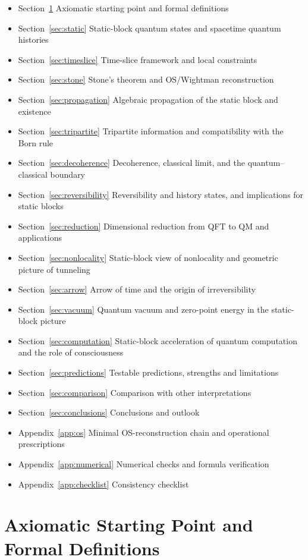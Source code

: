\documentclass[11pt]{article}
\theoremstyle{definition}
\theoremstyle{remark}
\begin{document}
\begin{itemize}
\item Section~\ref{sec:axioms} Axiomatic starting point and formal definitions
\item Section~\ref{sec:static} Static-block quantum states and spacetime quantum histories
\item Section~\ref{sec:timeslice} Time-slice framework and local constraints
\item Section~\ref{sec:stone} Stone's theorem and OS/Wightman reconstruction
\item Section~\ref{sec:propagation} Algebraic propagation of the static block and existence
\item Section~\ref{sec:tripartite} Tripartite information and compatibility with the Born rule
\item Section~\ref{sec:decoherence} Decoherence, classical limit, and the quantum--classical boundary
\item Section~\ref{sec:reversibility} Reversibility and history states, and implications for static blocks
\item Section~\ref{sec:reduction} Dimensional reduction from QFT to QM and applications
\item Section~\ref{sec:nonlocality} Static-block view of nonlocality and geometric picture of tunneling
\item Section~\ref{sec:arrow} Arrow of time and the origin of irreversibility
\item Section~\ref{sec:vacuum} Quantum vacuum and zero-point energy in the static-block picture
\item Section~\ref{sec:computation} Static-block acceleration of quantum computation and the role of consciousness
\item Section~\ref{sec:predictions} Testable predictions, strengths and limitations
\item Section~\ref{sec:comparison} Comparison with other interpretations
\item Section~\ref{sec:conclusions} Conclusions and outlook
\item Appendix~\ref{app:os} Minimal OS-reconstruction chain and operational prescriptions
\item Appendix~\ref{app:numerical} Numerical checks and formula verification
\item Appendix~\ref{app:checklist} Consistency checklist
\end{itemize}

\section{Axiomatic Starting Point and Formal Definitions}\label{sec:axioms}
\end{document}
